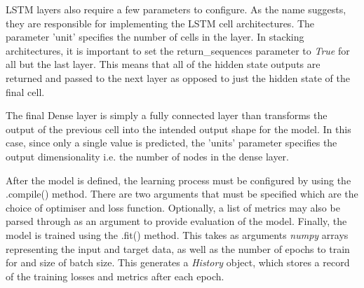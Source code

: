 \documentclass[10pt,onecolumn,letterpaper]{article}
\begin{document}
LSTM layers also require a few parameters to configure. As the name suggests, they are responsible for implementing the LSTM cell architectures. The parameter 'unit' specifies the number of cells in the layer. In stacking architectures, it is important to set the return\_sequences parameter to \textit{True} for all but the last layer. This means that all of the hidden state outputs are returned and passed to the next layer as opposed to just the hidden state of the final cell. 

The final Dense layer is simply a fully connected layer than transforms the output of the previous cell into the intended output shape for the model. In this case, since only a single value is predicted, the 'units' parameter specifies the output dimensionality i.e. the number of nodes in the dense layer.

After the model is defined, the learning process must be configured by using the .compile() method. There are two arguments that must be specified which are the choice of optimiser and loss function. Optionally, a list of metrics may also be parsed through as an argument to provide evaluation of the model. Finally, the model is trained using the .fit() method. This takes as arguments \textit{numpy} arrays representing the input and target data, as well as the number of epochs to train for and size of batch size. This generates a \textit{History} object, which stores a record of the training losses and metrics after each epoch.
\end{document}
